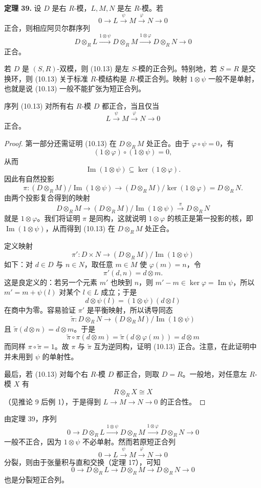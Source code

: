\noindent\textbf{定理 39.} 设 $D$ 是右 $R$-模，$L,M,N$ 是左 $R$-模。若
\[
0\longrightarrow L\xrightarrow{\psi}M\xrightarrow{\varphi}N\longrightarrow0
\]
正合，则相应阿贝尔群序列
\[
D\otimes_RL\xrightarrow{1\otimes\psi}D\otimes_RM\xrightarrow{1\otimes\varphi}D\otimes_RN\longrightarrow0
\tag{10.13}
\]
正合。

若 $D$ 是 $(S,R)$-双模，则 (10.13) 是左 $S$-模的正合列。特别地，若 $S=R$ 是交换环，则 (10.13) 关于标准 $R$-模结构是 $R$-模正合列。映射 $1\otimes\psi$ 一般不是单射，也就是说 (10.13) 一般不能扩张为短正合列。

序列 (10.13) 对所有右 $R$-模 $D$ 都正合，当且仅当
\[
L\xrightarrow{\psi}M\xrightarrow{\varphi}N\longrightarrow0
\]
正合。

\begin{proof}
第一部分还需证明 (10.13) 在 $D\otimes_RM$ 处正合。由于 $\varphi\circ\psi=0$，有
\[
(1\otimes\varphi)\circ(1\otimes\psi)=0,
\]
从而
\[
\operatorname{Im}(1\otimes\psi)\subseteq\ker(1\otimes\varphi).
\]
因此有自然投影
\[
\pi:(D\otimes_RM)/\operatorname{Im}(1\otimes\psi)
\longrightarrow
(D\otimes_RM)/\ker(1\otimes\varphi)=D\otimes_RN.
\]
由两个投影复合得到的映射
\[
D\otimes_RM\longrightarrow(D\otimes_RM)/\operatorname{Im}(1\otimes\psi)
\xrightarrow{\pi}D\otimes_RN
\]
就是 $1\otimes\varphi$。我们将证明 $\pi$ 是同构，这就说明 $1\otimes\varphi$ 的核正是第一投影的核，即 $\operatorname{Im}(1\otimes\psi)$，从而得到 (10.13) 在 $D\otimes_RM$ 处正合。

定义映射
\[
\pi':D\times N\longrightarrow (D\otimes_RM)/\operatorname{Im}(1\otimes\psi)
\]
如下：对 $d\in D$ 与 $n\in N$，取任意 $m\in M$ 使 $\varphi(m)=n$，令
\[
\pi'(d,n)=d\otimes m.
\]
这是良定义的：若另一个元素 $m'$ 也映到 $n$，则 $m'-m\in\ker\varphi=\operatorname{Im}\psi$，所以 $m'=m+\psi(l)$ 对某个 $l\in L$ 成立；于是
\[
d\otimes\psi(l)=(1\otimes\psi)(d\otimes l)
\]
在商中为零。容易验证 $\pi'$ 是平衡映射，所以诱导同态
\[
\widetilde\pi:D\otimes_RN\longrightarrow (D\otimes_RM)/\operatorname{Im}(1\otimes\psi)
\]
且 $\widetilde\pi(d\otimes n)=d\otimes m$。于是
\[
\widetilde\pi\circ\pi(d\otimes m)=\widetilde\pi(d\otimes\varphi(m))=d\otimes m
\]
而同样 $\pi\circ\widetilde\pi=1$。故 $\pi$ 与 $\widetilde\pi$ 互为逆同构，证明 (10.13) 正合。注意，在此证明中并未用到 $\psi$ 的单射性。

最后，若 (10.13) 对每个右 $R$-模 $D$ 都正合，则取 $D=R$。一般地，对任意左 $R$-模 $X$ 有
\[
R\otimes_RX\cong X
\]
（见推论 9 后例 1），于是得到 $L\to M\to N\to0$ 的正合性。
\end{proof}

由定理 39，序列
\[
0\longrightarrow D\otimes_RL\xrightarrow{1\otimes\psi}D\otimes_RM\xrightarrow{1\otimes\varphi}D\otimes_RN\longrightarrow0
\]
一般不正合，因为 $1\otimes\psi$ 不必单射。然而若原短正合列
\[
0\longrightarrow L\xrightarrow{\psi}M\xrightarrow{\varphi}N\longrightarrow0
\]
分裂，则由于张量积与直和交换（定理 17），可知
\[
0\longrightarrow D\otimes_RL\longrightarrow D\otimes_RM\longrightarrow D\otimes_RN\longrightarrow0
\]
也是分裂短正合列。

